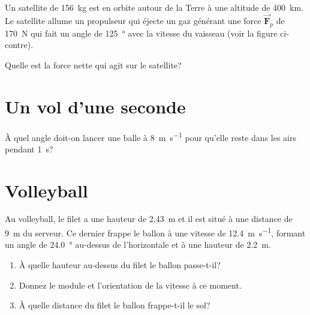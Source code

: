 \documentclass[nofonts]{tufte-handout}
\newcommand{\F}{\boldsymbol{\vec{F}}}
\newcommand{\vv}{\boldsymbol{\vec{v}}}
\begin{document}
Un satellite de \qty{156}{\kilogram} est en orbite autour de la Terre à une
altitude de \qty{400}{\kilo\meter}. Le satellite allume un propulseur qui
éjecte un gaz générant une force $\F_p$ de \qty{170}{\newton} qui
fait un angle de \SI{125}{\degree} avec la vitesse du vaisseau (voir la figure
ci-contre).
\begin{marginfigure}[-4\baselineskip]
\end{marginfigure}

Quelle est la force nette qui agit sur le satellite?


\section{Un vol d'une seconde}
À quel angle doit-on lancer une balle à \qty{8}{\meter\per\second} pour qu'elle
reste dans les airs pendant \qty{1}{\second}?


\section{Volleyball}
Au volleyball, le filet a une hauteur de \qty{2.43}{\meter} et il est situé à
une distance de \qty{9}{\meter} du serveur. Ce dernier frappe le ballon à une
vitesse de \qty{12.4}{\meter\per\second}, formant un angle de
\qty{24.0}{\degree} au-dessus de l'horizontale et à une hauteur de
\qty{2.2}{\meter}.
\begin{enumerate}[label=\alph*)]
  \item À quelle hauteur au-dessus du filet le ballon passe-t-il?
  \item Donnez le module et l'orientation de la vitesse à ce moment.
  \item À quelle distance du filet le ballon frappe-t-il le sol?
\end{enumerate}
\end{document}
